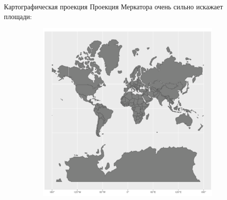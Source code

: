 \documentclass[
  ignorenonframetext,
  t]{beamer}
\begin{document}
\begin{frame}{Картографическая проекция}
\label{ux43aux430ux440ux442ux43eux433ux440ux430ux444ux438ux447ux435ux441ux43aux430ux44f-ux43fux440ux43eux435ux43aux446ux438ux44f-1}
Проекция Меркатора очень сильно искажает площади:

\begin{figure}

\begin{minipage}{0.50\linewidth}

\begin{figure}[H]

{\centering \includegraphics[width=1\linewidth,height=\textheight,keepaspectratio]{images/07-Merkator-1.png}

}


\end{figure}%

\end{minipage}%
%
\begin{minipage}{0.50\linewidth}

\begin{figure}[H]


\end{figure}
\end{minipage}
\end{figure}
\end{frame}
\end{document}

